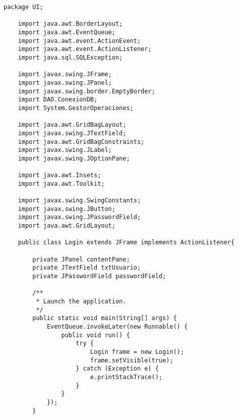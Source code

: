 


\begin{lstlisting}[caption=Login.java (App Escritorio)]
    package UI;

    import java.awt.BorderLayout;
    import java.awt.EventQueue;
    import java.awt.event.ActionEvent;
    import java.awt.event.ActionListener;
    import java.sql.SQLException;
    
    import javax.swing.JFrame;
    import javax.swing.JPanel;
    import javax.swing.border.EmptyBorder;
    import DAO.ConexionDB;
    import System.GestorOperaciones;
    
    import java.awt.GridBagLayout;
    import javax.swing.JTextField;
    import java.awt.GridBagConstraints;
    import javax.swing.JLabel;
    import javax.swing.JOptionPane;
    
    import java.awt.Insets;
    import java.awt.Toolkit;
    
    import javax.swing.SwingConstants;
    import javax.swing.JButton;
    import javax.swing.JPasswordField;
    import java.awt.GridLayout;
    
    public class Login extends JFrame implements ActionListener{
    
        private JPanel contentPane;
        private JTextField txtUsuario;
        private JPasswordField passwordField;
    
        /**
         * Launch the application.
         */
        public static void main(String[] args) {
            EventQueue.invokeLater(new Runnable() {
                public void run() {
                    try {
                        Login frame = new Login();
                        frame.setVisible(true);
                    } catch (Exception e) {
                        e.printStackTrace();
                    }
                }
            });
        }
    

\end{lstlisting}
